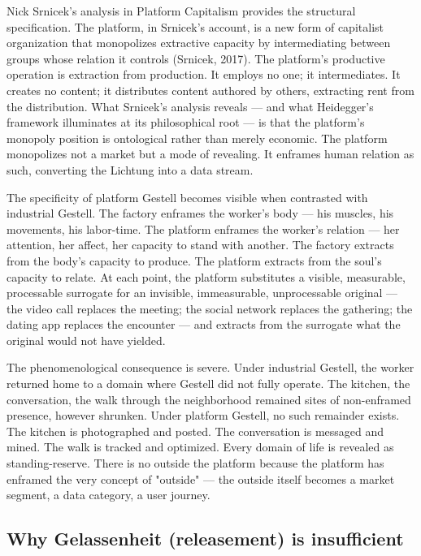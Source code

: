 Nick Srnicek's analysis in Platform Capitalism provides the structural specification. The platform, in Srnicek's account, is a new form of capitalist organization that monopolizes extractive capacity by intermediating between groups whose relation it controls (Srnicek, 2017). The platform's productive operation is extraction from production. It employs no one; it intermediates. It creates no content; it distributes content authored by others, extracting rent from the distribution. What Srnicek's analysis reveals — and what Heidegger's framework illuminates at its philosophical root — is that the platform's monopoly position is ontological rather than merely economic. The platform monopolizes not a market but a mode of revealing. It enframes human relation as such, converting the Lichtung into a data stream.

The specificity of platform Gestell becomes visible when contrasted with industrial Gestell. The factory enframes the worker's body — his muscles, his movements, his labor-time. The platform enframes the worker's relation — her attention, her affect, her capacity to stand with another. The factory extracts from the body's capacity to produce. The platform extracts from the soul's capacity to relate. At each point, the platform substitutes a visible, measurable, processable surrogate for an invisible, immeasurable, unprocessable original — the video call replaces the meeting; the social network replaces the gathering; the dating app replaces the encounter — and extracts from the surrogate what the original would not have yielded.

The phenomenological consequence is severe. Under industrial Gestell, the worker returned home to a domain where Gestell did not fully operate. The kitchen, the conversation, the walk through the neighborhood remained sites of non-enframed presence, however shrunken. Under platform Gestell, no such remainder exists. The kitchen is photographed and posted. The conversation is messaged and mined. The walk is tracked and optimized. Every domain of life is revealed as standing-reserve. There is no outside the platform because the platform has enframed the very concept of "outside" — the outside itself becomes a market segment, a data category, a user journey.

\subsection{Why Gelassenheit (releasement) is insufficient}

